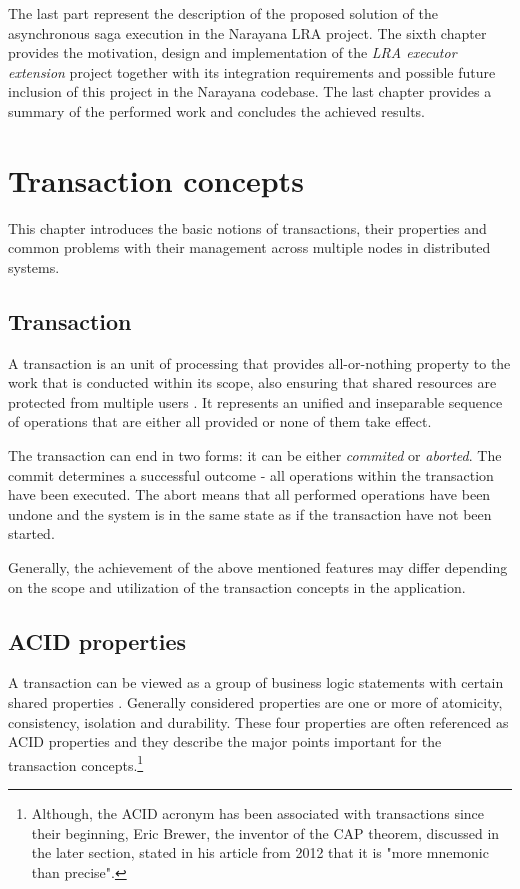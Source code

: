 \documentclass[oneside,
  digital, %
  table,   %
  nolof,     %
  nolot,     %
]{fithesis3}
\begin{document}
The last part represent the description of the proposed solution of the asynchronous saga execution in the Narayana LRA project. The sixth chapter provides the motivation, design and implementation of the \textit{LRA executor extension} project together with its integration requirements and possible future inclusion of this project in the Narayana codebase. The last chapter provides a summary of the performed work and concludes the achieved results.


\clearpage
\chapter{Transaction concepts}

This chapter introduces the basic notions of transactions, their properties and common problems with their management across multiple nodes in distributed systems. 

\section{Transaction}

A transaction is an unit of processing that provides all-or-nothing property to the work that is conducted within its scope, also ensuring that shared resources are protected from multiple users \cite{java_tran_processing}. It represents an unified and inseparable sequence of operations that are either all provided or none of them take effect. 

The transaction can end in two forms: it can be either \textit{commited} or \textit{aborted}. The commit determines a successful outcome - all operations within the transaction have been executed. The abort means that all performed operations have been undone and the system is in the same state as if the transaction have not been started.

Generally, the achievement of the above mentioned features may differ depending on the scope and utilization of the transaction concepts in the application.

\section{ACID properties}

A transaction can be viewed as a group of business logic statements with certain shared properties \cite{nar_wf}. Generally considered properties are one or more of atomicity, consistency, isolation and durability. These four properties are often referenced as ACID properties \cite{haerder_reuter_1983} and they describe the major points important for the transaction concepts.\footnote{Although, the ACID acronym has been associated with transactions since their beginning, Eric Brewer, the inventor of the CAP theorem, discussed in the later section, stated in his article from 2012 that it is "more mnemonic than precise".\cite{cap_12years}}
\end{document}
